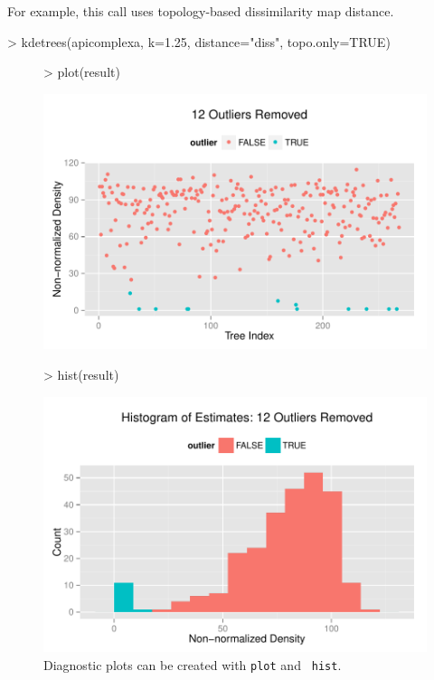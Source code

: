 \documentclass{article}
\begin{document}
For example, this call uses topology-based dissimilarity map distance.
\begin{Schunk}
\begin{Sinput}
> kdetrees(apicomplexa, k=1.25, distance="diss", topo.only=TRUE)
\end{Sinput}
\end{Schunk}

\begin{figure}
  \centering
\begin{Schunk}
\begin{Sinput}
> plot(result)
\end{Sinput}
\end{Schunk}
\includegraphics{kdetrees-plot}
\begin{Schunk}
\begin{Sinput}
> hist(result)
\end{Sinput}
\end{Schunk}
\includegraphics{kdetrees-hist}
  \caption{Diagnostic plots can be created with {\tt plot} and {\tt
      hist}.}
  \label{fig:diagplots}
\end{figure}
\end{document}
